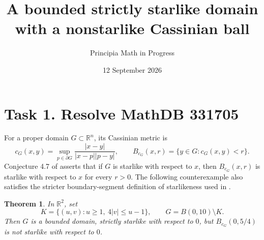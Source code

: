 \documentclass[11pt]{article}
\title{A bounded strictly starlike domain with a nonstarlike Cassinian ball}
\author{Principia Math in Progress}
\date{12 September 2026}
\newtheorem{theorem}{Theorem}
\begin{document}
\maketitle
\section*{Task 1. Resolve MathDB 331705}
For a proper domain $G\subset\mathbb R^n$, its Cassinian metric is
\[
 c_G(x,y)=\sup_{p\in\partial G}\frac{|x-y|}{|x-p||p-y|},
 \qquad B_{c_G}(x,r)=\{y\in G:c_G(x,y)<r\}.
\]
Conjecture 4.7 of \cite{KMS} asserts that if $G$ is starlike with respect to
$x$, then $B_{c_G}(x,r)$ is starlike with respect to $x$ for every $r>0$.
The following counterexample also satisfies the stricter boundary-segment
definition of starlikeness used in \cite{Klen}.

\begin{theorem}
In $\mathbb R^2$, set
\[
 K=\{(u,v):u\ge1,\ 4|v|\le u-1\},\qquad
 G=B(0,10)\setminus K.
\]
Then $G$ is a bounded domain, strictly starlike with respect to $0$, but
$B_{c_G}(0,5/4)$ is not starlike with respect to $0$.
\end{theorem}
\end{document}
